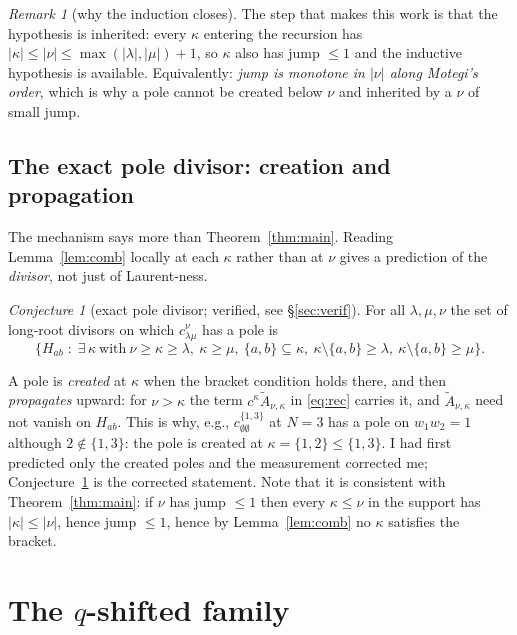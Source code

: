 \documentclass[11pt]{article}
\theoremstyle{plain}
\theoremstyle{definition}
\theoremstyle{remark}
\newtheorem{rem}[thm]{Remark}
\newtheorem{conj}[thm]{Conjecture}
\theoremstyle{plain}
\newcommand{\At}{\widetilde{A}}
\begin{document}
\begin{rem}[why the induction closes]
The step that makes this work is that the hypothesis is inherited: every
$\kappa$ entering the recursion has $|\kappa|\le|\nu|\le
\max(|\lambda|,|\mu|)+1$, so $\kappa$ also has jump $\le1$ and the inductive
hypothesis is available.  Equivalently: \emph{jump is monotone in $|\nu|$ along
Motegi's order}, which is why a pole cannot be created below $\nu$ and
inherited by a $\nu$ of small jump.
\end{rem}

\subsection{The exact pole divisor: creation and propagation}

The mechanism says more than Theorem~\ref{thm:main}.  Reading
Lemma~\ref{lem:comb} locally at each $\kappa$ rather than at $\nu$ gives a
prediction of the \emph{divisor}, not just of Laurent-ness.

\begin{conj}[exact pole divisor; verified, see \S\ref{sec:verif}]
\label{conj:divisor}
For all $\lambda,\mu,\nu$ the set of long-root divisors on which
$c^{\nu}_{\lambda\mu}$ has a pole is
\[
\bigl\{H_{ab}\;:\;\exists\,\kappa\ \text{with}\ \nu\ge\kappa\ge\lambda,\
\kappa\ge\mu,\ \{a,b\}\subseteq\kappa,\
\kappa\setminus\{a,b\}\ge\lambda,\ \kappa\setminus\{a,b\}\ge\mu\bigr\}.
\]
\end{conj}

A pole is \emph{created} at $\kappa$ when the bracket condition holds there, and
then \emph{propagates} upward: for $\nu>\kappa$ the term
$c^{\kappa}\At_{\nu,\kappa}$ in \eqref{eq:rec} carries it, and
$\At_{\nu,\kappa}$ need not vanish on $H_{ab}$.  This is why, e.g.,
$c^{\{1,3\}}_{\emptyset\emptyset}$ at $N=3$ has a pole on $w_1w_2=1$ although
$2\notin\{1,3\}$: the pole is created at $\kappa=\{1,2\}\le\{1,3\}$.  I had
first predicted only the created poles and the measurement corrected me;
Conjecture~\ref{conj:divisor} is the corrected statement.  Note that it is
consistent with Theorem~\ref{thm:main}: if $\nu$ has jump $\le1$ then every
$\kappa\le\nu$ in the support has $|\kappa|\le|\nu|$, hence jump $\le1$, hence
by Lemma~\ref{lem:comb} no $\kappa$ satisfies the bracket.

\section{The $q$-shifted family}
\label{sec:qfam}
\end{document}
